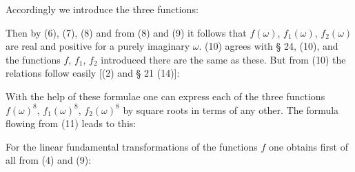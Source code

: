 
Accordingly we introduce the three functions:

Then by (6), (7), (8)
and from (8) and (9) it follows that $f(\omega)$, $f_1(\omega)$,
$f_2(\omega)$ are real and positive for a purely imaginary $\omega$.
(10) agrees with § 24, (10), and the functions $f$, $f_1$, $f_2$
introduced there are the same as these. But from (10) the relations
follow easily [(2) and § 21 (14)]:

With the help of these formulae one can express each of the three
functions $f(\omega)^8$, $f_1(\omega)^8$, $f_2(\omega)^8$ by square
roots in terms of any other. The formula flowing from (11) leads to
this:

For the linear fundamental transformations of the functions $f$ one
obtains first of all from (4) and (9):
